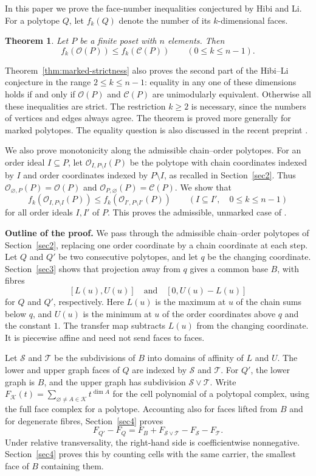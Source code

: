 \documentclass[a4paper,12pt]{amsart}
\newtheorem{theorem}{Theorem}[section]
\theoremstyle{definition}
\theoremstyle{remark}
\newcommand{\OO}{\mathcal O}
\newcommand{\CC}{\mathcal C}
\begin{document}
In this paper we prove the face-number inequalities conjectured by Hibi and Li.
For a polytope $Q$, let $f_k(Q)$ denote the number of its $k$-dimensional faces.
\begin{theorem}\label{thm:face-inequality}
Let $P$ be a finite poset with $n$ elements.
Then
\[
 f_k(\mathcal O(P))\leq f_k(\mathcal C(P))  \qquad (0\leq k\leq n-1).
\]
\end{theorem}
Theorem~\ref{thm:marked-strictness} also proves the second part of the Hibi--Li conjecture \cite[Conjecture~2.4(b)]{HL16} in the range $2\leq k\leq n-1$: equality in any one of these dimensions holds if and only if $\OO(P)$ and $\CC(P)$ are unimodularly equivalent.
Otherwise all these inequalities are strict.
The restriction $k\geq2$ is necessary, since the numbers of vertices and edges always agree.
The theorem is proved more generally for marked polytopes.
The equality question is also discussed in the recent preprint \cite[Section~5]{Lee26}.

We also prove monotonicity along the admissible chain--order polytopes.
For an order ideal $I\subseteq P$, let $\OO_{I,P\setminus I}(P)$ be the polytope with chain coordinates indexed by $I$ and order coordinates indexed by $P\setminus I$, as recalled in Section~\ref{sec2}.
Thus $\OO_{\varnothing,P}(P)=\mathcal O(P)$ and $\OO_{P,\varnothing}(P)=\mathcal C(P)$.
We show that
\[
 f_k(\OO_{I,P\setminus I}(P))\leq f_k(\OO_{I',P\setminus I'}(P))  \qquad  (I\subseteq I',\quad 0\leq k\leq n-1)
\]
for all order ideals $I,I'$ of $P$.
This proves the admissible, unmarked case of \cite[Conjecture~5.3]{FF16}.

\medskip
\noindent\textbf{Outline of the proof.}
We pass through the admissible chain--order polytopes of Section~\ref{sec2}, replacing one order coordinate by a chain coordinate at each step.
Let $Q$ and $Q'$ be two consecutive polytopes, and let $q$ be the changing coordinate.
Section~\ref{sec3} shows that projection away from $q$ gives a common base $B$, with fibres
$$
 [L(u),U(u)] \quad\text{and}\quad [0,U(u)-L(u)]
$$
for $Q$ and $Q'$, respectively.
Here $L(u)$ is the maximum at $u$ of the chain sums below $q$, and $U(u)$ is the minimum at $u$ of the order coordinates above $q$ and the constant $1$.
The transfer map subtracts $L(u)$ from the changing coordinate.
It is piecewise affine and need not send faces to faces.

Let $\mathcal S$ and $\mathcal T$ be the subdivisions of $B$ into domains of affinity of $L$ and $U$.
The lower and upper graph faces of $Q$ are indexed by $\mathcal S$ and $\mathcal T$.
For $Q'$, the lower graph is $B$, and the upper graph has subdivision $\mathcal S\vee\mathcal T$.
Write $F_{\mathcal K}(t)=\sum_{\varnothing\ne A\in\mathcal K}t^{\dim A}$ for the cell polynomial of a polytopal complex, using the full face complex for a polytope.
Accounting also for faces lifted from $B$ and for degenerate fibres, Section~\ref{sec4} proves
$$
 F_{Q'}-F_Q  = F_B+F_{\mathcal S\vee\mathcal T}-F_{\mathcal S}-F_{\mathcal T}.
$$
Under relative transversality, the right-hand side is coefficientwise nonnegative.
Section~\ref{sec4} proves this by counting cells with the same carrier, the smallest face of $B$ containing them.
\end{document}
